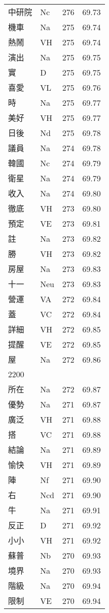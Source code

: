 \documentclass[twocolumn]{book}
\begin{document}
\begin{supertabular}{llrr}
中研院 & Nc & 276 &  69.73\\
機車 & Na & 275 &  69.74\\
熱鬧 & VH & 275 &  69.74\\
演出 & Na & 275 &  69.75\\
實 & D & 275 &  69.75\\
喜愛 & VL & 275 &  69.76\\
時 & Na & 275 &  69.77\\
美好 & VH & 275 &  69.77\\
日後 & Nd & 275 &  69.78\\
議員 & Na & 274 &  69.78\\
韓國 & Nc & 274 &  69.79\\
衛星 & Na & 274 &  69.79\\
收入 & Na & 274 &  69.80\\
徹底 & VH & 273 &  69.80\\
預定 & VE & 273 &  69.81\\
註 & Na & 273 &  69.82\\
勝 & VH & 273 &  69.82\\
房屋 & Na & 273 &  69.83\\
十一 & Neu & 273 &  69.83\\
營運 & VA & 272 &  69.84\\
蓋 & VC & 272 &  69.84\\
詳細 & VH & 272 &  69.85\\
提醒 & VE & 272 &  69.85\\
屋 & Na & 272 &  69.86\\
2200\\
所在 & Na & 272 &  69.87\\
優勢 & Na & 271 &  69.87\\
廣泛 & VH & 271 &  69.88\\
搭 & VC & 271 &  69.88\\
結論 & Na & 271 &  69.89\\
愉快 & VH & 271 &  69.89\\
陣 & Nf & 271 &  69.90\\
右 & Ncd & 271 &  69.90\\
牛 & Na & 271 &  69.91\\
反正 & D & 271 &  69.92\\
小小 & VH & 271 &  69.92\\
蘇普 & Nb & 270 &  69.93\\
境界 & Na & 270 &  69.93\\
階級 & Na & 270 &  69.94\\
限制 & VE & 270 &  69.94\\

\end{supertabular}
\end{document}
